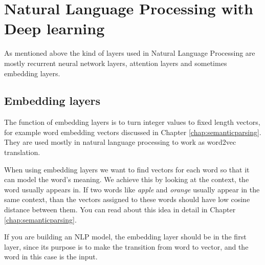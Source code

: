 \section{Natural Language Processing with Deep learning}
As mentioned above the kind of layers used in Natural Language Processing are mostly recurrent neural network layers, attention layers and sometimes embedding layers.

\subsection{Embedding layers}

The function of embedding layers is to turn integer values to fixed length vectors, for example word embedding vectors discussed in Chapter \ref{chap:semanticparsing}. They are used mostly in natural language processing to work as word2vec translation.

When using embedding layers we want to find vectors for each word so that it can model the word's meaning. We achieve this by looking at the context, the word usually appears in. If two words like \textit{apple} and \textit{orange} usually appear in the same context, than the vectors assigned to these words should have low cosine distance between them. You can read about this idea in detail in Chapter \ref{chap:semanticparsing}.

If you are building an NLP model, the embedding layer should be in the first layer, since its purpose is to make the transition from word to vector, and the word in this case is the input.

